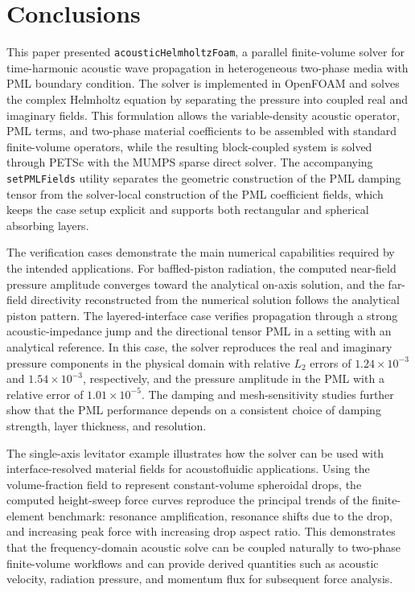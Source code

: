 \documentclass[final,num,12pt]{elsarticle}
\begin{document}
\section{Conclusions}

\label{sec:conclusions}

This paper presented \texttt{acousticHelmholtzFoam}, a parallel finite-volume
solver for time-harmonic acoustic wave propagation in heterogeneous two-phase
media with PML boundary condition.  The solver is implemented in OpenFOAM and solves the complex Helmholtz
equation by separating the pressure into coupled real and imaginary fields.
This formulation allows the variable-density acoustic operator, PML terms, and
two-phase material coefficients to be assembled with standard finite-volume
operators, while the resulting block-coupled system is solved through PETSc
with the MUMPS sparse direct solver.  The accompanying \texttt{setPMLFields}
utility separates the geometric construction of the PML damping tensor from the
solver-local construction of the PML coefficient fields, which keeps the case
setup explicit and supports both rectangular and spherical absorbing layers.

The verification cases demonstrate the main numerical capabilities required by
the intended applications.  For baffled-piston radiation, the computed
near-field pressure amplitude converges toward the analytical on-axis solution,
and the far-field directivity reconstructed from the numerical solution follows
the analytical piston pattern.  The layered-interface case verifies propagation
through a strong acoustic-impedance jump and the directional tensor PML in a
setting with an analytical reference.  In this case, the solver reproduces the
real and imaginary pressure components in the physical domain with relative
$L_2$ errors of $1.24\times10^{-3}$ and $1.54\times10^{-3}$, respectively, and
the pressure amplitude in the PML with a relative error of
$1.01\times10^{-5}$.  The damping and mesh-sensitivity studies further show
that the PML performance depends on a consistent choice of damping strength,
layer thickness, and resolution.

The single-axis levitator example illustrates how the solver can be used with
interface-resolved material fields for acoustofluidic applications.  Using the
volume-fraction field to represent constant-volume spheroidal drops, the
computed height-sweep force curves reproduce the principal trends of the
finite-element benchmark: resonance amplification, resonance shifts due
to the drop, and increasing peak force with increasing drop aspect ratio.  This
demonstrates that the frequency-domain acoustic solve can be coupled naturally
to two-phase finite-volume workflows and can provide derived quantities such as
acoustic velocity, radiation pressure, and momentum flux for subsequent force
analysis.
\end{document}
